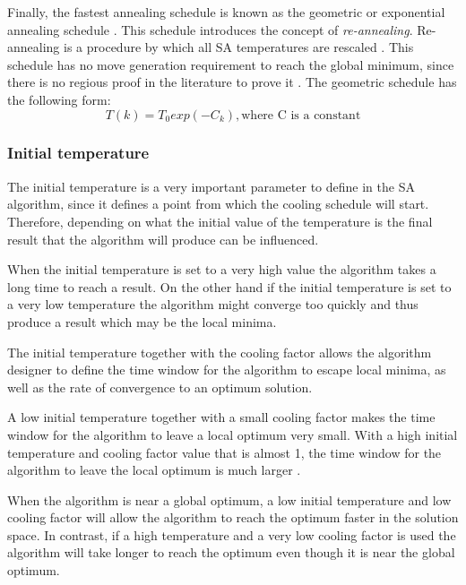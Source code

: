 Finally, the fastest annealing schedule is known as the geometric or exponential annealing schedule \cite{SASingleMultiObj}. This schedule introduces the concept of \emph{re-annealing}. Re-annealing is a procedure by which all SA temperatures are rescaled \cite{VeryFastSAImageEnchancement}. This schedule has no move generation requirement to reach the global minimum, since there is no regious proof in the literature to prove it \cite{SASingleMultiObj}. The geometric schedule has the following form:
\begin{equation}
\label{eq:geocooling}
	T(k)=T_0exp(-C_k),\text{where C is a constant}
\end{equation}
\subsubsection{Initial temperature}
The initial temperature is a very important parameter to define in the SA algorithm, since it defines a point from which the cooling schedule will start. Therefore, depending on what the initial value of the temperature is the final result that the algorithm will produce can be influenced\cite{SALongestCommon,VariousCoolingSA,AutoConfigSA}.

When the initial temperature is set to a very high value the algorithm takes a long time to reach a result. On the other hand if the initial temperature is set to a very low temperature the algorithm might converge too quickly and thus produce a result which may be the local minima\cite{SALongestCommon,VariousCoolingSA,AutoConfigSA}.

The initial temperature together with the cooling factor allows the algorithm designer to define the time window for the algorithm to escape local minima, as well as the rate of convergence to an optimum solution\cite{SALongestCommon,VariousCoolingSA}.

A low initial temperature together with a small cooling factor makes the time window for the algorithm to leave a local optimum very small\cite{SALongestCommon}. With a high initial temperature and cooling factor value that is almost 1, the time window for the algorithm to leave the local optimum is much larger \cite{SALongestCommon}. 

When the algorithm is near a global optimum, a low initial temperature and low cooling factor will allow the algorithm to reach the optimum faster in the solution space. In contrast, if a high temperature and a very low cooling factor is used the algorithm will take longer to reach the optimum even though it is near the global optimum\cite{SALongestCommon}.

